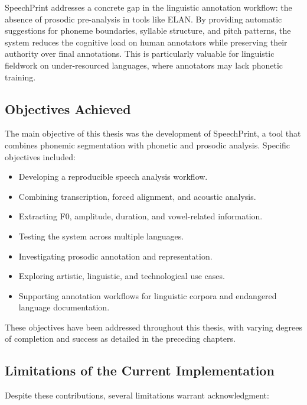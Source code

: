 SpeechPrint addresses a concrete gap in the linguistic annotation workflow: the absence of prosodic pre-analysis in tools like ELAN. By providing automatic suggestions for phoneme boundaries, syllable structure, and pitch patterns, the system reduces the cognitive load on human annotators while preserving their authority over final annotations. This is particularly valuable for linguistic fieldwork on under-resourced languages, where annotators may lack phonetic training.

\subsection{Objectives Achieved}

The main objective of this thesis was the development of SpeechPrint, a tool that combines phonemic segmentation with phonetic and prosodic analysis. Specific objectives included:

\begin{itemize}
\item Developing a reproducible speech analysis workflow.
\item Combining transcription, forced alignment, and acoustic analysis.
\item Extracting F0, amplitude, duration, and vowel-related information.
\item Testing the system across multiple languages.
\item Investigating prosodic annotation and representation.
\item Exploring artistic, linguistic, and technological use cases.
\item Supporting annotation workflows for linguistic corpora and endangered language documentation.
\end{itemize}

These objectives have been addressed throughout this thesis, with varying degrees of completion and success as detailed in the preceding chapters.

\subsection{Limitations of the Current Implementation}

Despite these contributions, several limitations warrant acknowledgment:


